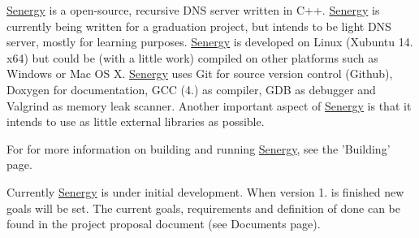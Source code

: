 \hyperlink{namespace_senergy}{Senergy} is a open-\/source, recursive D\-N\-S server written in C++. \hyperlink{namespace_senergy}{Senergy} is currently being written for a graduation project, but intends to be light D\-N\-S server, mostly for learning purposes. \hyperlink{namespace_senergy}{Senergy} is developed on Linux (Xubuntu 14. x64) but could be (with a little work) compiled on other platforms such as Windows or Mac O\-S X. \hyperlink{namespace_senergy}{Senergy} uses Git for source version control (Github), Doxygen for documentation, G\-C\-C (4.) as compiler, G\-D\-B as debugger and Valgrind as memory leak scanner. Another important aspect of \hyperlink{namespace_senergy}{Senergy} is that it intends to use as little external libraries as possible.

For for more information on building and running \hyperlink{namespace_senergy}{Senergy}, see the 'Building' page.

Currently \hyperlink{namespace_senergy}{Senergy} is under initial development. When version 1. is finished new goals will be set. The current goals, requirements and definition of done can be found in the project proposal document (see Documents page). 